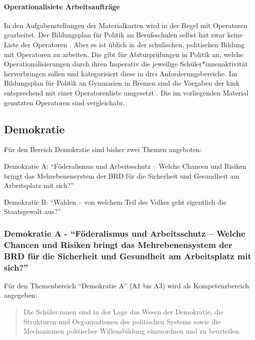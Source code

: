 \paragraph{Operationalisiete Arbeitsaufträge}
In den Aufgabenstellungen der Materialkarten wird in der Regel mit Operatoren gearbeitet. Der Bildungsplan für Politik an Berufsschulen selbst hat zwar keine Liste der Operatoren \autocite{bplan}. Aber es ist üblich in der schulischen, politischen Bildung mit Operatoren zu arbeiten. Die \textcite[14-18]{KMK.2005} gibt für Abiturprüfungen in Politik an, welche Operationalisierungen durch ihren Imperativ die jeweilige Schüler*innenaktivität hervorbringen sollen und kategorisiert diese in drei Anforderungsbereiche. Im Bildungsplan für Politik an Gymnasien in Bremen sind die Vorgaben der \gls{kmk} entsprechend mit einer Operatorenliste umgesetzt \autocite[13-14]{lower2008}.
Die im vorliegenden Material genutzten Operatoren sind vergleichabr. 

\subsection{Demokratie \label{Denmokratie}}
Für den Bereich Demokratie sind bisher zwei Themen angeboten:
\begin{myenumerate}
    \item Demokratie A: \enquote{Föderalismus und Arbeitsschutz – Welche Chancen und Risiken bringt das Mehrebenensystem der BRD für die Sicherheit und Gesundheit am Arbeitsplatz mit sich?}
    \item Demokratie B: \enquote{Wahlen – von welchem Teil des Volkes geht eigentlich die Staatsgewalt aus?}
\end{myenumerate}



\subsubsection{Demokratie A - \enquote{Föderalismus und Arbeitsschutz – Welche Chancen und Risiken bringt das Mehrebenensystem der BRD für die Sicherheit und Gesundheit am Arbeitsplatz mit sich?} \label{DemokratieA}}

Für den Themenbereich \enquote{Demokratie A} (A1 bis A3) wird als Kompetenzbereich angegeben:
\begin{quote}
    Die Schüler:innen sind in der Lage das Wesen der Demokratie, die Strukturen und Organisationen des politischen Systems sowie die Mechanismen politischer Willensbildung einzuordnen und zu beurteilen.
    
    \autocite[im Bildungsplan:][16]{bplan}
\end{quote}



